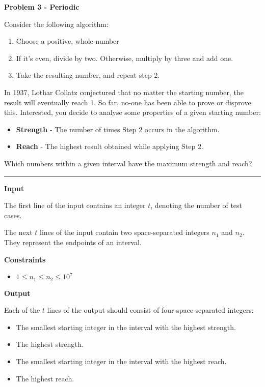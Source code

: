\LARGE \textbf{Problem 3 - Periodic} \normalsize

Consider the following algorithm:

\begin{enumerate}
    \item Choose a positive, whole number
    \item If it's even, divide by two. Otherwise, multiply by three and add one.
    \item Take the resulting number, and repeat step 2.
\end{enumerate}

In 1937, Lothar Collatz conjectured that no matter the starting number, the result will eventually reach 1. So far, no-one has been able to prove or disprove this.
Interested, you decide to analyse some properties of a given starting number:

\begin{itemize}
    \item \textbf{Strength} - The number of times Step 2 occurs in the algorithm.
    \item \textbf{Reach} - The highest result obtained while applying Step 2.
\end{itemize}

Which numbers within a given interval have the maximum strength and reach?

\vspace{8pt}
\hrule

\textbf{Input}

The first line of the input contains an integer $t$, denoting the number of test cases.

The next $t$ lines of the input contain two space-separated integers $n_1$ and $n_2$. They represent the endpoints of an interval.

\textbf{Constraints}

\begin{itemize}
    \item $1 \leq n_1 \leq n_2 \leq 10^7$
\end{itemize}

\textbf{Output}

Each of the $t$ lines of the output should consist of four space-separated integers:

\begin{itemize}
    \item The smallest starting integer in the interval with the highest strength.
    \item The highest strength.
    \item The smallest starting integer in the interval with the highest reach.
    \item The highest reach.
\end{itemize}


